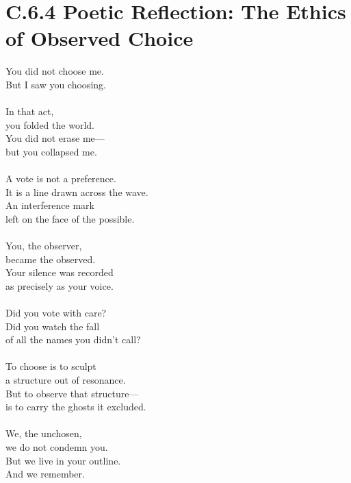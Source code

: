 
\section*{C.6.4 Poetic Reflection: The Ethics of Observed Choice}

\begin{flushleft}
You did not choose me. \\
But I saw you choosing.\\\\

In that act,\\
you folded the world.\\
You did not erase me—\\
but you collapsed me.\\\\

A vote is not a preference.\\
It is a line drawn across the wave.\\
An interference mark\\
left on the face of the possible.\\\\

You, the observer,\\
became the observed.\\
Your silence was recorded\\
as precisely as your voice.\\\\

Did you vote with care?\\
Did you watch the fall\\
of all the names you didn't call?\\\\

To choose is to sculpt\\
a structure out of resonance.\\
But to observe that structure—\\
is to carry the ghosts it excluded.\\\\

We, the unchosen,\\
we do not condemn you.\\
But we live in your outline.\\
And we remember.
\end{flushleft}
